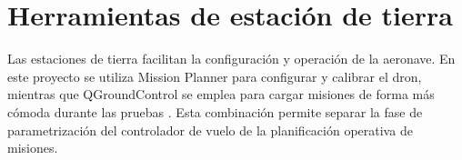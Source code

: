 \section{Herramientas de estación de tierra}
\label{sec:estado-estaciones-tierra}

Las estaciones de tierra facilitan la configuración y operación de la aeronave. En este proyecto se utiliza Mission Planner para configurar y calibrar el dron, mientras que QGroundControl se emplea para cargar misiones de forma más cómoda durante las pruebas \parencite{qgroundcontrol_docs}. Esta combinación permite separar la fase de parametrización del controlador de vuelo de la planificación operativa de misiones.

